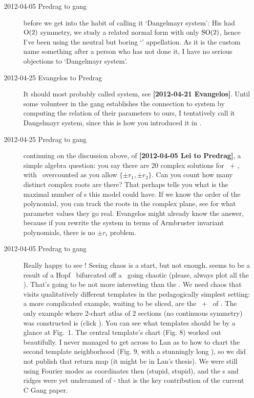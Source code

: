 \begin{description}
\item[2012-04-05 Predrag to {\twoMode} gang] before we get into the habit of
calling it `Dangelmayr system': His had $\textrm{O}(2)$ symmetry, we study a
related normal form with only  $\textrm{SO}(2)$, hence I've been using the
neutral but boring `{\twoMode}' appellation. As it is the custom name
something after a person who has not done it, I have no serious
objections to `Dangelmayr system'.

\item[2012-04-25 Evangelos to Predrag] It should most probably called
{\twoMode} system, see {\bf [2012-04-21 Evangelos]}. Until some
volunteer in the gang establishes the connection to {\twoMode}
system by computing the relation of their parameters to ours, I
tentatively call it Dangelmayr system, since this is how you introduced
it in .

\item[2012-04-25 Predrag to {\twoMode} gang] continuing on the discussion
above, of {\bf [2012-04-05 Lei to Predrag]}, a simple algebra question:
you say there are 20 complex solutions for \eqva\ + \reqva, with \reqva\
overcounted as you allow $\{\pm r_1, \pm r_2\}$. Can you count how many
distinct complex roots are there? That perhaps tells you what is the maximal
number of \template s this model could have. If we know the order of the
polynomial, you can track the roots in the complex plane, see for what
parameter values they go real. Evangelos might already know the answer,
because if you rewrite the {\twoMode} system in terms of Armbruster invariant
polynomials, there is no $\pm r_i$ problem.

\item[2012-04-05 Predrag to {\twoMode} gang] Really happy to see
! Seeing chaos is a start, but not enough.
\reffig{fig:dangelmayrChaos} seems to be a result of a Hopf \rpo\
bifurcated off a \reqv\ going chaotic (please, always plot all the
\reqva). That's going to be not more interesting than the \cLf. We need
chaos that visits qualitatively different templates in the pedagogically
simplest setting: a more complicated example, waiting to be sliced, are
the \eqva\ + \reqva\ of \refref{SCD07}. The only example where 2-chart
atlas of 2 sections (no continuous symmetry) was constructed is
\refref{lanCvit07} (click
).
You can see what templates should be by a glance at Fig.~1. The central
template's chart (Fig. 8) worked out beautifully. I never managed to get
across to Lan as to how to chart the second template neighborhood (Fig.
9, with a stunningly long \po), so we did not publish that return map (it
might be in Lan's thesis). We were still using Fourier modes as
coordinates then (stupid, stupid), and the \poincBord s and ridges were
yet undreamed of - that is the key contribution of the current C Gang
paper.


\end{description}
